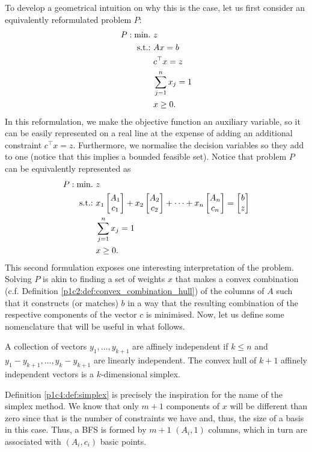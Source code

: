 To develop a geometrical intuition on why this is the case, let us first consider an equivalently reformulated problem $P$:
%
\begin{align*}
	P : \mathop{\text{min.~}} & z           \\
	\mathop{\text{s.t.:~}} & Ax = b        \\
	& c^\top x = z      \\	
	& \sum_{j=1}^nx_j=1 \\
	& x \geq 0.
\end{align*}
% 
In this reformulation, we make the objective function an auxiliary variable, so it can be easily represented on a real line at the expense of adding an additional constraint $c^\top x = z$. Furthermore, we normalise the decision variables so they add to one (notice that this implies a bounded feasible set). Notice that problem $P$ can be equivalently represented as  
%
\begin{align*}
	P : \mathop{\text{min.~}} & z     \\
	\mathop{\text{s.t.:~}} & x_1\begin{bmatrix}
		A_1 \\
		c_1
	\end{bmatrix} + x_2\begin{bmatrix}
		A_2 \\
		c_2
	\end{bmatrix} + \dots +
	x_n\begin{bmatrix}
		A_n \\
		c_n
	\end{bmatrix} = \begin{bmatrix}
		b \\
		z
	\end{bmatrix}\\
	& \sum_{j=1}^nx_j=1 \\
	& x \geq 0.
\end{align*}
% 
This second formulation exposes one interesting interpretation of the problem. Solving $P$ is akin to finding a set of weights $x$ that makes a convex combination (c.f. Definition \ref{p1c2:def:convex_combination_hull}) of the columns of $A$ such that it constructs (or matches) $b$ in a way that the resulting combination of the respective components of the vector $c$ is minimised. Now, let us define some nomenclature that will be useful in what follows.
%
\begin{definition} \label{p1c4:def:simplex}
	A collection of vectors $y_1, \dots, y_{k+1}$ are affinely independent if $k \leq n$ and $y_1 - y_{k+1}, \dots, y_{k} - y_{k+1}$ are linearly independent. The convex hull of $k+1$ affinely independent vectors is a $k$-dimensional simplex.
\end{definition}
%
Definition \ref{p1c4:def:simplex} is precisely the inspiration for the name of the simplex method. We know that only $m+1$ components of $x$ will be different than zero since that is the number of constraints we have and, thus, the size of a basis in this case. Thus, a BFS is formed by $m+1$ $(A_i, 1)$ columns, which in turn are associated with $(A_i,c_i)$ basic points. 

